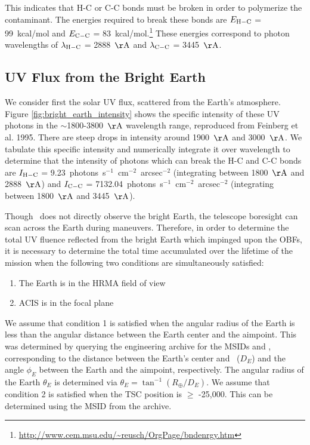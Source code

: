 \documentclass[11pt]{article}
\begin{document}
This indicates that H-C or C-C bonds must be broken in order to polymerize the contaminant. The
energies required to break these bonds are $E_{\rm H-C}$ = 99~kcal/mol and $E_{\rm C-C}$ =
83~kcal/mol.\footnote{\url{http://www.cem.msu.edu/~reusch/OrgPage/bndenrgy.htm}} These energies
correspond to photon wavelengths of $\lambda_{\rm H-C}$ = 2888~${\rm \AA}$ and $\lambda_{\rm C-C}$
= 3445~${\rm \AA}$.

\subsection{UV Flux from the Bright Earth}

We consider first the solar UV flux, scattered from the Earth's atmosphere. Figure
\ref{fig:bright_earth_intensity} shows the specific intensity of these UV photons in
the $\sim$1800-3800~${\rm \AA}$ wavelength range, reproduced from Feinberg et al. 1995. There
are steep drops in intensity around 1900~${\rm \AA}$ and 3000~${\rm \AA}$. We tabulate
this specific intensity and numerically integrate it over wavelength to determine that
the intensity of photons which can break the H-C and C-C bonds are $I_{\rm H-C}$ =
9.23~photons~s$^{-1}$~cm$^{-2}$~arcsec$^{-2}$ (integrating between 1800~${\rm \AA}$ and
2888~${\rm \AA}$) and $I_{\rm C-C}$ = 7132.04~photons~s$^{-1}$~cm$^{-2}$~arcsec$^{-2}$
(integrating between 1800~${\rm \AA}$ and 3445~${\rm \AA}$).

Though \chandra~does not directly observe the bright Earth, the telescope boresight can scan
across the Earth during maneuvers. Therefore, in order to determine the total UV fluence
reflected from the bright Earth which impinged upon the OBFs, it is necessary to determine
the total time accumulated over the lifetime of the mission when the following two conditions
are simultaneously satisfied:

\begin{enumerate}
\item The Earth is in the HRMA field of view
\item ACIS is in the focal plane
\end{enumerate}

We assume that condition 1 is satisfied when the angular radius of the Earth is less than the
angular distance between the Earth center and the aimpoint. This was determined by querying
the  engineering archive for the MSIDs  and ,
corresponding to the distance between the Earth's center and \chandra~($D_E$) and the angle $\phi_E$ between
the Earth and the aimpoint, respectively. The angular radius of the Earth $\theta_E$ is determined
via $\theta_E = \tan^{-1} (R_\oplus/D_E)$. We assume that condition 2 is satisfied when the TSC
position is $\geq$ -25,000. This can be determined using the MSID  from the 
archive.
\end{document}
